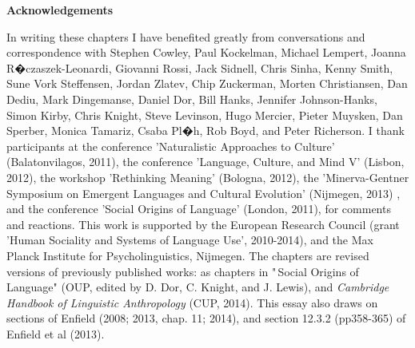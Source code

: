 \newpage


\textbf{Acknowledgements}



In writing these chapters I have benefited greatly from conversations 
and correspondence with Stephen Cowley, Paul Kockelman, Michael Lempert, 
Joanna R�czaszek-Leonardi, Giovanni Rossi, Jack Sidnell, Chris Sinha, 
Kenny Smith, Sune Vork Steffensen, Jordan Zlatev, Chip Zuckerman, Morten 
Christiansen, Dan Dediu, Mark Dingemanse, Daniel Dor, Bill Hanks, 
Jennifer Johnson-Hanks, Simon Kirby, Chris Knight, Steve Levinson, Hugo 
Mercier, Pieter Muysken, Dan Sperber, Monica Tamariz, Csaba Pl�h, Rob 
Boyd, and Peter Richerson. I thank participants at the conference 
'Naturalistic Approaches to Culture' (Balatonvilagos, 2011), the 
conference 'Language, Culture, and Mind V' (Lisbon, 2012), the workshop 
'Rethinking Meaning' (Bologna, 2012), the 'Minerva-Gentner Symposium on 
Emergent Languages and Cultural Evolution' (Nijmegen, 2013) , and the 
conference 'Social Origins of Language' (London, 2011), for comments and 
reactions. This work is supported by the European Research Council 
(grant 'Human Sociality and Systems of Language Use', 2010-2014), and 
the Max Planck Institute for Psycholinguistics, Nijmegen. The chapters 
are revised versions of previously published works: as chapters in 
"\,Social Origins of Language" (OUP, edited by D. Dor, C. Knight, and J. 
Lewis), and \textit{Cambridge Handbook of Linguistic Anthropology} 
(CUP, 2014). This essay also draws on sections of Enfield (2008; 2013, 
chap. 11; 2014), and section 12.3.2 (pp358-365) of Enfield et al (2013). 







